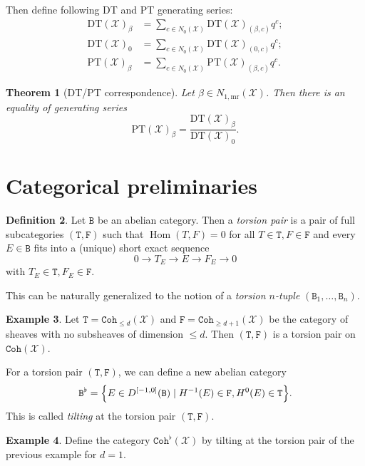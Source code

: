 \documentclass{amsart}
\newtheorem{thm}{Theorem}[section]
\theoremstyle{definition}
\newtheorem{defn}[thm]{Definition}
\newtheorem{exm}[thm]{Example}
\theoremstyle{remark}
\theoremstyle{plain}
\theoremstyle{definition}
\theoremstyle{remark}
\newcommand{\mc}[1]{\mathcal{#1}}
\newcommand{\mr}[1]{\mathrm{#1}}
\newcommand{\mt}[1]{\mathtt{#1}}
\newcommand{\1}{\mathbf{1}}
\newcommand{\2}{\mathbf{2}}
\newcommand{\3}{\mathbf{3}}
\DeclareMathOperator{\Hom}{Hom}
\begin{document}
Then define following DT and PT generating series:
\begin{align*}
    \mr{DT}(\mc{X})_{\beta} &= \sum_{c \in N_0(\mc{X})} \mr{DT}(\mc{X})_{(\beta, c)} q^c; \\
    \mr{DT}(\mc{X})_{0} &= \sum_{c \in N_0(\mc{X})} \mr{DT}(\mc{X})_{(0, c)} q^c; \\
    \mr{PT}(\mc{X})_{\beta} &= \sum_{c \in N_0(\mc{X})} \mr{PT}(\mc{X})_{(\beta, c)} q^c.
\end{align*}

\begin{thm}[DT/PT correspondence]
    Let $\beta \in N_{1, \mr{mr}}(\mc{X})$. Then there is an equality of generating series
    \[ \mr{PT}(\mc{X})_{\beta} = \frac{\mr{DT}(\mc{X})_{\beta}}{\mr{DT}(\mc{X})_0}. \]
\end{thm}

\section{Categorical preliminaries}

\begin{defn}
    Let $\mt{B}$ be an abelian category. Then a \textit{torsion pair} is a pair of full subcategories $(\mt{T}, \mt{F})$ such that $\Hom(T, F) = 0$ for all $T \in \mt{T}, F \in \mt{F}$ and every $E \in \mt{B}$ fits into a (unique) short exact sequence
    \[ 0 \to T_E \to E \to F_E \to 0 \]
    with $T_E \in \mt{T}, F_E \in \mt{F}$.
\end{defn}
This can be naturally generalized to the notion of a \textit{torsion $n$-tuple} $(\mt{B}_1, \ldots, \mt{B}_n)$.

\begin{exm}
    Let $\mt{T} = \mt{Coh}_{\leq d}(\mc{X})$ and $\mt{F} = \mt{Coh}_{\geq d+1}(\mc{X})$ be the category of sheaves with no subsheaves of dimension $\leq d$. Then $(\mt{T}, \mt{F})$ is a torsion pair on $\mt{Coh}(\mc{X})$.
\end{exm}

For a torsion pair $(\mt{T}, \mt{F})$, we can define a new abelian category 
\[ \mt{B}^{\flat} = \qty{E \in D^{[-1,0]}(\mt{B}) \mid H^{-1}(E) \in \mt{F}, H^0(E) \in \mt{T}}. \]
This is called \textit{tilting} at the torsion pair $(\mt{T}, \mt{F})$.

\begin{exm}
    Define the category $\mt{Coh}^{\flat}(\mc{X})$ by tilting at the torsion pair of the previous example for $d = 1$.
\end{exm}
\end{document}
